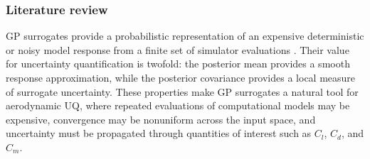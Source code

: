 \documentclass[a4paper,12pt]{article}
\newcommand{\bs}{\boldsymbol}
\newcommand{\R}{\mathbb{R}}
\newcommand{\x}{\mathbf{x}}
\begin{document}
%
%

\subsubsection{Literature review}

GP surrogates provide a probabilistic representation of an expensive deterministic or noisy model response from a finite set of simulator evaluations \cite{sacks1989design,santner2003design,Rasmussen2006,gramacy2020surrogates}. Their value for uncertainty quantification is twofold: the posterior mean provides a smooth response approximation, while the posterior covariance provides a local measure of surrogate uncertainty. These properties make GP surrogates a natural tool for aerodynamic UQ, where repeated evaluations of computational models may be expensive, convergence may be nonuniform across the input space, and uncertainty must be propagated through quantities of interest such as $C_l$, $C_d$, and $C_m$. 
\end{document}
